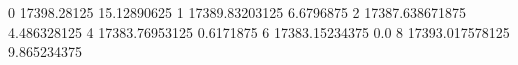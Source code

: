 0 17398.28125 15.12890625
1 17389.83203125 6.6796875
2 17387.638671875 4.486328125
4 17383.76953125 0.6171875
6 17383.15234375 0.0
8 17393.017578125 9.865234375
